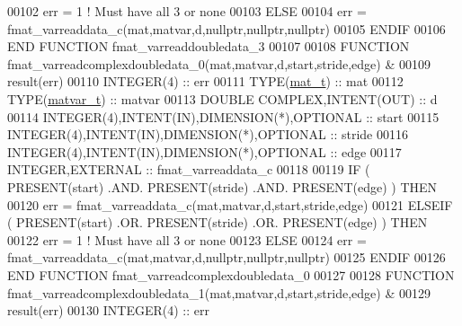 \begin{DoxyCode}
00102         err = 1    \textcolor{comment}{! Must have all 3 or none}
00103     \textcolor{keywordflow}{ELSE}
00104         err = fmat\_varreaddata\_c(mat,matvar,d,nullptr,nullptr,nullptr)
00105 \textcolor{keywordflow}{    ENDIF}
00106 \textcolor{keyword}{END FUNCTION }fmat\_varreaddoubledata\_3
00107 
00108 \textcolor{keyword}{FUNCTION }fmat\_varreadcomplexdoubledata\_0(mat,matvar,d,start,stride,edge) &
00109                                                              result(err)
00110     \textcolor{keywordtype}{INTEGER(4)}                                  :: err
00111     \textcolor{keywordtype}{TYPE}(\hyperlink{group___m_a_t_gab0fc888f5a5d79943b16284b1f91c2e8}{mat\_t})                                 :: mat
00112     \textcolor{keywordtype}{TYPE}(\hyperlink{group___m_a_t_structmatvar__t}{matvar\_t})                              :: matvar
00113     \textcolor{keywordtype}{DOUBLE COMPLEX},\textcolor{keywordtype}{INTENT(OUT)}                  :: d
00114     \textcolor{keywordtype}{INTEGER(4)},\textcolor{keywordtype}{INTENT(IN)},\textcolor{keywordtype}{DIMENSION(*)},\textcolor{keywordtype}{OPTIONAL} :: start
00115     \textcolor{keywordtype}{INTEGER(4)},\textcolor{keywordtype}{INTENT(IN)},\textcolor{keywordtype}{DIMENSION(*)},\textcolor{keywordtype}{OPTIONAL} :: stride
00116     \textcolor{keywordtype}{INTEGER(4)},\textcolor{keywordtype}{INTENT(IN)},\textcolor{keywordtype}{DIMENSION(*)},\textcolor{keywordtype}{OPTIONAL} :: edge
00117     \textcolor{keywordtype}{INTEGER},\textcolor{keywordtype}{EXTERNAL}                            :: fmat\_varreaddata\_c
00118 
00119     \textcolor{keywordflow}{IF} ( \textcolor{keyword}{PRESENT}(start) .AND. \textcolor{keyword}{PRESENT}(stride) .AND. \textcolor{keyword}{PRESENT}(edge) ) \textcolor{keywordflow}{THEN}
00120         err = fmat\_varreaddata\_c(mat,matvar,d,start,stride,edge)
00121     \textcolor{keywordflow}{ELSEIF} ( \textcolor{keyword}{PRESENT}(start) .OR. \textcolor{keyword}{PRESENT}(stride) .OR. \textcolor{keyword}{PRESENT}(edge) ) \textcolor{keywordflow}{THEN}
00122         err = 1    \textcolor{comment}{! Must have all 3 or none}
00123     \textcolor{keywordflow}{ELSE}
00124         err = fmat\_varreaddata\_c(mat,matvar,d,nullptr,nullptr,nullptr)
00125 \textcolor{keywordflow}{    ENDIF}
00126 \textcolor{keyword}{END FUNCTION }fmat\_varreadcomplexdoubledata\_0
00127 
00128 \textcolor{keyword}{FUNCTION }fmat\_varreadcomplexdoubledata\_1(mat,matvar,d,start,stride,edge) &
00129                                                              result(err)
00130     \textcolor{keywordtype}{INTEGER(4)}                                  :: err

\end{DoxyCode}
